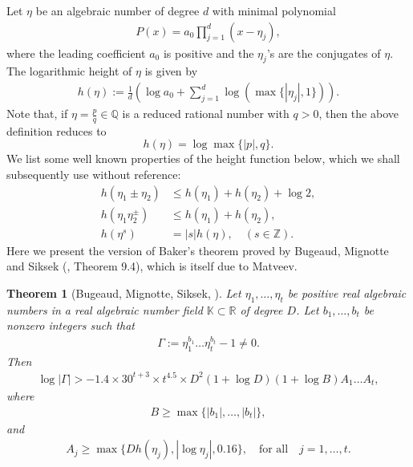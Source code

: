 \documentclass[10pt,a4paper]{article}
\newtheorem{theorem}{Theorem}
\begin{document}
\noindent Let $\eta$ be an algebraic number of degree $d$ with minimal polynomial
\begin{align*}
P(x) = a_0 \prod_{j = 1}^d (x - \eta_j),
\end{align*}
where the leading coefficient $a_0$ is positive and the $\eta_j$'s are the conjugates of $\eta$. The logarithmic height of $\eta$ is given by
\begin{align*}
h(\eta) := \frac{1}{d} \left( \log a_0 + \sum_{j = 1}^d \log \left( \max \{|\eta_j|, 1  \}  \right)   \right).
\end{align*}
Note that, if $\eta = \frac{p}{q} \in \mathbb{Q}$ is a reduced rational number with $q > 0$, then the above definition reduces to $$h(\eta) = \log \max \{ |p|,q \}.$$
We list some well known properties of the height function below, which we shall subsequently use without reference:
\begin{equation}\label{heights}
\begin{aligned}
h(\eta_1 \pm \eta_2) & \leq h(\eta_1) + h(\eta_2) + \log 2, \\
h(\eta_1 \eta_2 ^{\pm}) & \leq h(\eta_1) + h(\eta_2), \\
h(\eta^s) & = |s| h(\eta), \quad (s \in \mathbb{Z}).
\end{aligned}
\end{equation}
Here we present the version of Baker's theorem proved by Bugeaud, Mignotte and Siksek (\cite{BMS}, Theorem 9.4), which is itself due to Matveev.
\begin{theorem}[Bugeaud, Mignotte, Siksek, \cite{BMS}]\label{thm1}
Let $\eta_1, \ldots, \eta_t$ be positive real algebraic numbers in a real algebraic number field $\mathbb{K} \subset \mathbb{R}$ of degree $D$. Let $b_1, \ldots, b_t$ be nonzero integers such that 
\begin{align*}
\Gamma := \eta_1 ^{b_1} \ldots \eta_t ^{b_t} - 1 \neq 0.
\end{align*}
Then
\begin{align*}
\log | \Gamma| > - 1.4 \times 30^{t+3} \times t^{4.5} \times D^2 (1 + \log D)(1 + \log B)A_1 \ldots A_t,
\end{align*}
where
\begin{align*}
B \geq \max \{|b_1|, \ldots, |b_t| \},
\end{align*}
and
\begin{align*}
A_j \geq \max \{ D h(\eta_j), |\log \eta_j|, 0.16  \}, \quad \text{for all} \quad j = 1, \ldots,t.
\end{align*}
\end{theorem}
\end{document}
